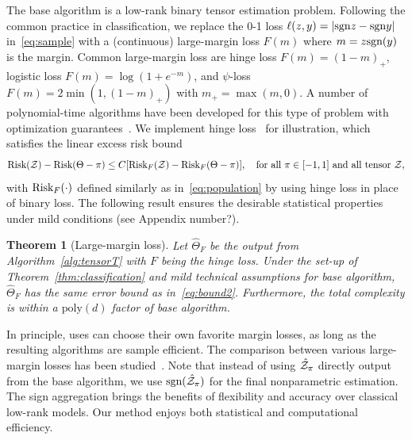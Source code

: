 \documentclass{article}
\theoremstyle{plain}
\newtheorem{thm}{Theorem}
\theoremstyle{definition}
\def\sign{\textup{sgn}}
\def\risk{\textup{Risk}}
\begin{document}
The base algorithm is a low-rank binary tensor estimation problem. Following the common practice in classification, we replace the 0-1 loss $\ell(z,y)=|\sign z - \sign y|$ in~\eqref{eq:sample} with a (continuous) large-margin loss $F(m)$ where $m=z\sign(y)$ is the margin. Common large-margin loss are hinge loss $F(m) = (1-m)_+$, logistic loss $F(m) =\log(1+e^{-m})$, and $\psi$-loss $F(m)=2\min(1,(1-m)_+)$ with $m_{+}=\max(m,0)$. A number of polynomial-time algorithms have been developed for this type of problem with optimization guarantees~\citep{ghadermarzy2018learning,wang2018learning,hong2020generalized,alquier2019estimation}. We implement hinge loss~\cite{alquier2019estimation,genzel2020robust} for illustration, which satisfies the linear excess risk bound
\[
\risk(\tZ)-\risk(\Theta-\pi)\leq C[\risk_F(\tZ)-\risk_F(\Theta-\pi)],\quad \text{for all }\pi\in[-1,1] \text{ and all tensor }\tZ,
\]
with $\risk_F(\cdot)$ defined similarly as in~\eqref{eq:population} by using hinge loss in place of binary loss. The following result ensures the desirable statistical properties under mild conditions (see Appendix {\color{red} number?}). 

\begin{thm}[Large-margin loss] Let $\hat \Theta_F$ be the output from Algorithm~\ref{alg:tensorT} with $F$ being the hinge loss. Under the set-up of Theorem~\ref{thm:classification} and mild technical assumptions for base algorithm, $\hat \Theta_F$ has the same error bound as in~\eqref{eq:bound2}. Furthermore, the total complexity is within a $\text{poly}(d)$ factor of base algorithm. 
\end{thm}
In principle, uses can choose their own favorite margin losses, as long as the resulting algorithms are sample efficient. The comparison between various large-margin losses has been studied~\cite{bartlett2006convexity}. Note that instead of using $\hat {\mathcal{Z}}_\pi$ directly output from the base algorithm, we use $\sign(\hat \tZ_\pi)$ for the final nonparametric estimation. The sign aggregation brings the benefits of flexibility and accuracy over classical low-rank models. Our method enjoys both statistical and computational efficiency. 


\end{document}
